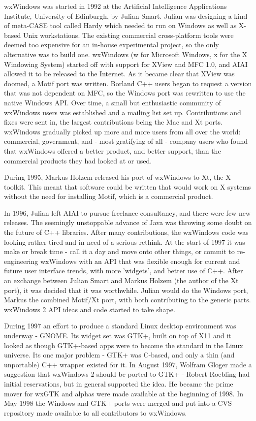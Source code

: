 wxWindows was started in 1992 at the Artificial Intelligence
Applications Institute, University of Edinburgh, by Julian
Smart. Julian was designing a kind of meta-CASE tool called
Hardy which needed to run on Windows as well as X-based Unix
workstations. The existing commercial cross-platform tools were
deemed too expensive for an in-house experimental project, so
the only alternative was to build one. wxWindows (w for Microsoft
Windows, x for the X Windowing System) started off with support for XView and MFC 1.0, and
AIAI allowed it to be released to the Internet. As it became
clear that XView was doomed, a Motif port was written. Borland
C++ users began to request a version that was not dependent on
MFC, so the Windows port was rewritten to use the native Windows
API. Over time, a small but enthusiastic community of wxWindows
users was established and a mailing list set up. Contributions
and fixes were sent in, the largest contributions being the Mac
and Xt ports. wxWindows gradually picked up more and more users
from all over the world: commercial, government, and - most
gratifying of all - company users who found that wxWindows
offered a better product, and better support, than the
commercial products they had looked at or used.

During 1995, Markus Holzem released his port of wxWindows to Xt,
the X toolkit. This meant that software could be written that
would work on X systems without the need for installing Motif,
which is a commercial product.

In 1996, Julian left AIAI to pursue freelance consultancy, and
there were few new releases. The seemingly unstoppable advance
of Java was throwing some doubt on the future of C++ libraries.
After many contributions, the wxWindows code was looking rather
tired and in need of a serious rethink. At the start of 1997 it
was make or break time - call it a day and move onto other
things, or commit to re-engineering wxWindows with an API that
was flexible enough for current and future user interface
trends, with more 'widgets', and better use of C++. After an
exchange between Julian Smart and Markus Holzem (the author of
the Xt port), it was decided that it was worthwhile. Julian
would do the Windows port, Markus the combined Motif/Xt port,
with both contributing to the generic parts. wxWindows 2 API
ideas and code started to take shape.

During 1997 an effort to produce a standard Linux desktop
environment was underway - GNOME. Its widget set was GTK+, built
on top of X11 and it looked as though GTK+-based apps were to
become the standard in the Linux universe. Its one major problem
- GTK+ was C-based, and only a thin (and unportable) C++ wrapper
existed for it. In August 1997, Wolfram Gloger made a suggestion
that wxWindows 2 should be ported to GTK+ - Robert Roebling had
initial reservations, but in general supported the idea. He
became the prime mover for wxGTK and alphas were made available
at the beginning of 1998. In May 1998 the Windows and GTK+ ports
were merged and put into a CVS repository made available to all
contributors to wxWindows.

